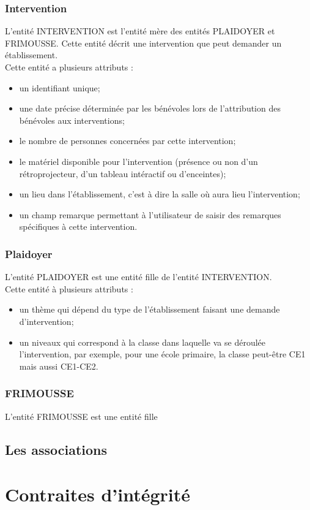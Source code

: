 \documentclass[asi, sansVersion]{picINSA}
\begin{document}
\subsection*{Intervention}
L'entité INTERVENTION est l'entité mère des entités PLAIDOYER et FRIMOUSSE. Cette entité décrit une intervention que peut demander un établissement. \\
Cette entité a plusieurs attributs :
\begin{itemize}
\item un identifiant unique;
\item une date précise déterminée par les bénévoles lors de l'attribution des bénévoles aux interventions;
\item le nombre de personnes concernées par cette intervention;
\item le matériel disponible pour l'intervention (présence ou non d'un rétroprojecteur, d'un tableau intéractif ou d'enceintes);
\item un lieu dans l'établissement, c'est à dire la salle où aura lieu l'intervention;
\item un champ remarque permettant à l'utilisateur de saisir des remarques spécifiques à cette intervention. 
\end{itemize}

\subsection*{Plaidoyer}
L'entité PLAIDOYER est une entité fille de l'entité INTERVENTION. \\
Cette entité à plusieurs attributs : 
\begin{itemize}
\item un thème qui dépend du type de l'établissement faisant une demande d'intervention;
\item un niveaux qui correspond à la classe dans laquelle va se déroulée l'intervention, par exemple, pour une école primaire, la classe peut-être CE1 mais aussi CE1-CE2.
\end{itemize}

\subsection*{FRIMOUSSE}
L'entité FRIMOUSSE est une entité fille 
\section{Les associations}

\chapter{Contraites d'intégrité}
\end{document}
